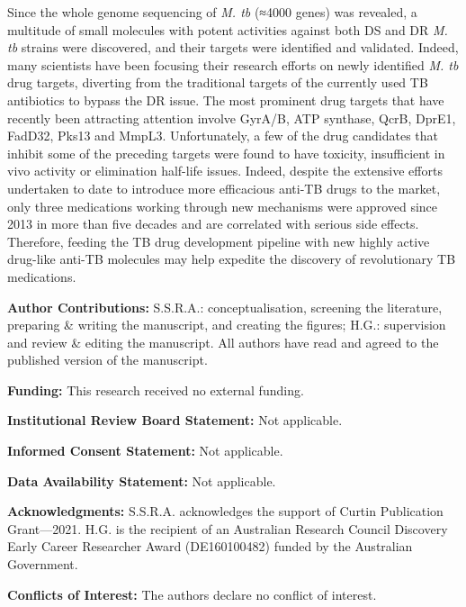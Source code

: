\documentclass{article}
\begin{document}
Since the whole genome sequencing of \textit{M. tb} (≈4000 genes) was revealed, a multitude of small molecules with potent activities against both DS and DR \textit{M. tb} strains were discovered, and their targets were identified and validated. Indeed, many scientists have been focusing their research efforts on newly identified \textit{M. tb} drug targets, diverting from the traditional targets of the currently used TB antibiotics to bypass the DR issue. The most prominent drug targets that have recently been attracting attention involve GyrA/B, ATP synthase, QcrB, DprE1, FadD32, Pks13 and MmpL3. Unfortunately, a few of the drug candidates that inhibit some of the preceding targets were found to have toxicity, insufficient in vivo activity or elimination half-life issues. Indeed, despite the extensive efforts undertaken to date to introduce more efficacious anti-TB drugs to the market, only three medications working through new mechanisms were approved since 2013 in more than five decades and are correlated with serious side effects. Therefore, feeding the TB drug development pipeline with new highly active drug-like anti-TB molecules may help expedite the discovery of revolutionary TB medications.

\textbf{Author Contributions:} S.S.R.A.: conceptualisation, screening the literature, preparing \& writing the manuscript, and creating the figures; H.G.: supervision and review \& editing the manuscript. All authors have read and agreed to the published version of the manuscript.

\textbf{Funding:} This research received no external funding.

\textbf{Institutional Review Board Statement:} Not applicable.

\textbf{Informed Consent Statement:} Not applicable.

\textbf{Data Availability Statement:} Not applicable.

\textbf{Acknowledgments:} S.S.R.A. acknowledges the support of Curtin Publication Grant—2021. H.G. is the recipient of an Australian Research Council Discovery Early Career Researcher Award (DE160100482) funded by the Australian Government.

\textbf{Conflicts of Interest:} The authors declare no conflict of interest.
\end{document}
